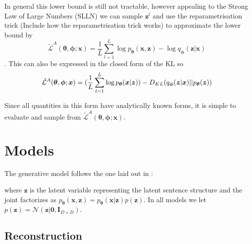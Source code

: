 In general this lower bound is still not tractable, however appealing to the
Strong Law of Large Numbers (SLLN) we can sample $\bm{z}^{l}$ and use the
reparametrisation trick (Include how the reparametrisation trick works) to approximate the lower bound by
\begin{equation}
  \label{eq:SGVB}
  \tilde{\mathcal{L}}^A(\bm{\theta}, \bm{\phi}; \bm{x}) = \frac{1}{L} \sum_{l = 1}^L \log p_{\bm{\theta}}(\bm{x}, \bm{z}) - \log q_{\bm{\phi}}(\bm{z} | \bm{x})
\end{equation}.
This can also be expressed in the closed form of the KL so
\begin{equation}
  \label{eq:SGVB_analytical_KL}
  \tilde{\mathcal{L}}^A(\bm{\theta}, \bm{\phi}; \bm{x}) = (\frac{1}{L} \sum_{l = 1}^L \log p_{\bm{\theta}}(\bm{x} | \bm{z})) - D_{KL}(q_{\bm{\phi}}(\bm{z} | \bm{x}) || p_{\bm{\theta}}(\bm{z}))
\end{equation}

Since all quantities in this form have analytically known forms, it is simple to
evaluate and sample from $\tilde{\mathcal{L}}^A(\bm{\theta}, \bm{\phi}; \bm{x})$.

\section{Models}

The generative model follows the one laid out in
\cite{kingma_auto-encoding_2013}:

\begin{figure}[H]
  \center
\end{figure}

where $\bm{z}$ is the latent variable representing the latent sentence structure
and the joint factorizes as $p_{\bm{\theta}}(\bm{x}, \bm{z}) =
p_{\bm{\theta}}(\bm{x} | \bm{z})p(\bm{z})$. In all models we let $p(\bm{z}) =
\mathcal{N}(\bm{z}| \bm{0}, \bm{I}_{D \times D})$.

\subsection{Reconstruction}

